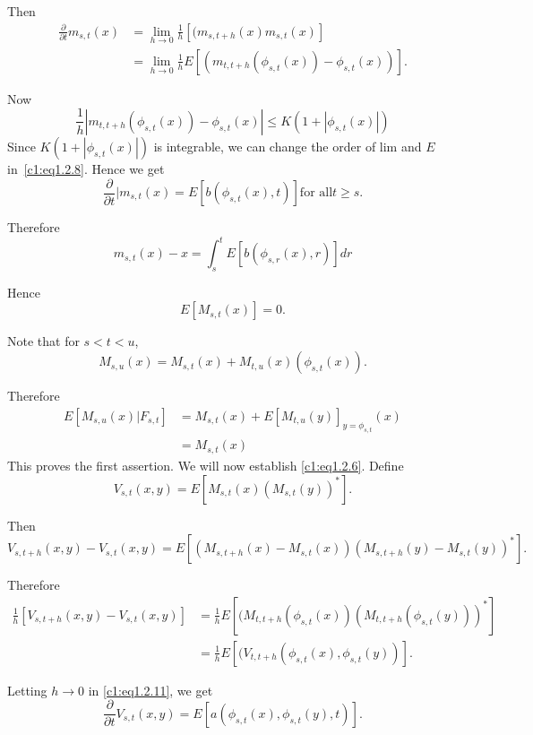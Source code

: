 Then
\begin{align*}
  \frac{\partial}{\partial t} m_{s,t}(x) & = \lim_{h \rightarrow 0}
  \frac{1}{h}  [(m_{s,t+h} (x)m_{s,t}(x)] \\ 
  & = \lim_{h \rightarrow 0} \frac{1}{h} E [(m_{t,t+h}(\phi_{s,t}(x))
    -  \phi_{s,t}(x))]. \tag{1.2.8}\label{c1:eq1.2.8} 
\end{align*}\pageoriginale

Now 
$$
\frac{1}{h}|m_{t,t+h}(\phi_{s,t}(x)) - \phi_{s,t}(x)| \le K (1 +
|\phi_{s,t}(x)|) 
$$
Since $ K (1 + |\phi_{s,t}(x)|)$ is integrable, we can change the
order of lim and $E$ in~\eqref{c1:eq1.2.8}. Hence we get 
$$
\frac{\partial}{\partial t}|m_{s,t}(x) = E [b(\phi_{s,t}(x), t)]
\text{for all} t \ge s. 
$$

Therefore
\begin{equation*}
m_{s,t}(x) - x = \int^t_s E [b(\phi_{s,r}(x),r)]dr 
\tag{1.2.9}\label{c1:eq1.2.9}
\end{equation*}

Hence
$$
E [M_{s,t}(x)] = 0.
$$

Note that for $s < t < u$,
$$
M_{s,u}(x) = M_{s,t}(x) + M_{t, u}(x) (\phi_{s,t}(x)).
$$

Therefore
\begin{align*}
  E[M_{s,u}(x) | F_{s,t}] & = M_{s,t}(x) + 
E[M_{t,u}(y)]_{y = \phi_{s,t}}(x) \\
  & = M_{s,t}(x)
\end{align*}
This proves the first assertion. We will now establish \eqref{c1:eq1.2.6}. Define
\begin{equation*}
  V_{s,t}(x,y) = E[M_{s,t}(x) (M_{s,t}(y))^\ast]. 
\tag{1.2.10}\label{c1:eq1.2.10}
\end{equation*}

Then\pageoriginale
$$
V_{s,t+h}(x,y) - V_{s,t}(x,y) = E[(M_{s,t+h}(x) - M_{s,t}(x))
  (M_{s,t+h}(y) - M_{s,t}(y))^*]. 
$$

Therefore 
\begin{align*}
  \frac{1}{h} [V_{s,t+h}(x,y) - V_{s,t}(x,y)] & = \frac{1}{h}
  E[(M_{t,t+h}(\phi_{s,t}(x)) (M_{t,t+h}(\phi_{s,t}(y)))^* ] \\ 
  & = \frac{1}{h}
  E[(V_{t,t+h}(\phi_{s,t}(x),\phi_{s,t}(y))]. 
\tag{1.2.11}\label{c1:eq1.2.11} 
\end{align*}

Letting $h \rightarrow 0$ in \eqref{c1:eq1.2.11}, we get
$$
\frac{\partial}{\partial t} V_{s,t}(x,y) = E[a(\phi_{s,t}(x),\phi_{s,t}(y),t) ].
$$
 
